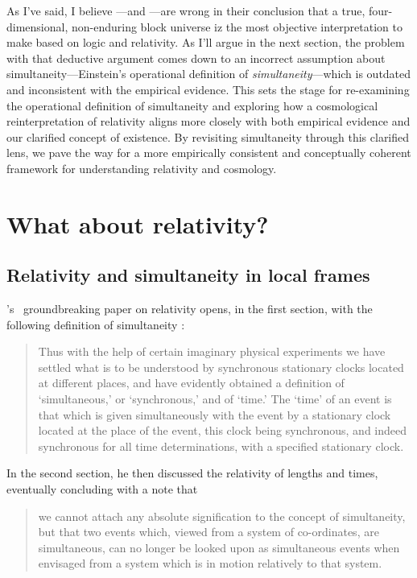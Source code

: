 \documentclass[aps,rmp,groupedaddress,twocolumn,10pt]{revtex4-2}
\begin{document}
As I've said, I believe \cite{Greene2004}---and \cite{Einstein1938}---are wrong in their conclusion that a true, four-dimensional, non-enduring block universe iz the most objective interpretation to make based on logic and relativity. As I'll argue in the next section, the problem with that deductive argument comes down to an incorrect assumption about simultaneity---Einstein's operational definition of \textit{simultaneity}---which is outdated and inconsistent with the empirical evidence. This sets the stage for re-examining the operational definition of simultaneity and exploring how a cosmological reinterpretation of relativity aligns more closely with both empirical evidence and our clarified concept of existence. By revisiting simultaneity through this clarified lens, we pave the way for a more empirically consistent and conceptually coherent framework for understanding relativity and cosmology.

\section{What about relativity?}\label{sec:relativity}

\subsection{Relativity and simultaneity in local frames}

\citeauthor{Einstein1905a}'s~\citeyearpar{Einstein1905a} groundbreaking paper on relativity opens, in the first section, with the following definition of simultaneity \cite{Einstein1952}:
\begin{quote}
Thus with the help of certain imaginary physical experiments we have settled what is to be understood by synchronous stationary clocks located at different places, and have evidently obtained a definition of `simultaneous,' or `synchronous,' and of `time.' The `time' of an event is that which is given simultaneously with the event by a stationary clock located at the place of the event, this clock being synchronous, and indeed synchronous for all time determinations, with a specified stationary clock.
\end{quote}
In the second section, he then discussed the relativity of lengths and times, eventually concluding with a note that
\begin{quote}
we cannot attach any absolute signification to the concept of simultaneity, but that two events which, viewed from a system of co-ordinates, are simultaneous, can no longer be looked upon as simultaneous events when envisaged from a system which is in motion relatively to that system.
\end{quote}
\end{document}
